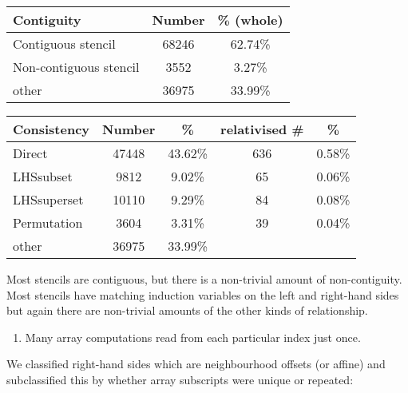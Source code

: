 \begin{center}
\begin{minipage}{0.42\linewidth}
\hspace{-1.6em}
\begin{tabular}{l|S[table-format=4]S[table-format=2.2]}
\textbf{Contiguity} & \textbf{Number} & \% {(whole)} \\\hline
Contiguous stencil         & 68246     & 62.74\%  \\\hline
Non-contiguous stencil     & 3552      & 3.27\%  \\\hline
other                      & 36975     & 33.99\% \\\hline
\end{tabular}
\vspace{2.4em}
\end{minipage}
\begin{minipage}{0.5\linewidth}
\begin{tabular}{l|S[table-format=4]S[table-format=2.2]S[table-format=4]S[table-format=2.2]}
\textbf{Consistency} & \textbf{Number} & \% & \textbf{relativised \#} & \% \\\hline
Direct                            & 47448     & 43.62\% & 636       & 0.58\%  \\\hline
LHSsubset                         & 9812      & 9.02\% & 65        & 0.06\%  \\\hline
LHSsuperset                       & 10110     & 9.29\%  & 84        & 0.08\%  \\\hline
Permutation                       & 3604      & 3.31\%  & 39        & 0.04\%  \\\hline
other                             & 36975     & 33.99\% \\\hline
\end{tabular}
\end{minipage}
\end{center}
Most stencils are contiguous, but there is a non-trivial
amount of non-contiguity. Most stencils have matching induction
variables on the left and right-hand sides but again there
are non-trivial amounts of the other kinds of relationship.
\begin{enumerate}[resume]
\item Many array computations read from each particular index just
  once.
\end{enumerate}
%
We classified right-hand sides which are neighbourhood offsets (or
affine) and subclassified this by whether array subscripts were
unique or repeated:

